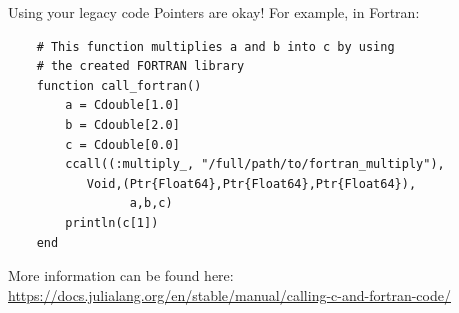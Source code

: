 \documentclass{beamer}
\begin{document}
\begin{frame}[fragile]{Using your legacy code}
Pointers are okay! For example, in Fortran:

\begin{Verbatim}
    # This function multiplies a and b into c by using 
    # the created FORTRAN library
    function call_fortran()
        a = Cdouble[1.0]
        b = Cdouble[2.0]
        c = Cdouble[0.0]
        ccall((:multiply_, "/full/path/to/fortran_multiply"),
           Void,(Ptr{Float64},Ptr{Float64},Ptr{Float64}),
                 a,b,c)
        println(c[1])
    end
\end{Verbatim}

\pause
More information can be found here: \url{https://docs.julialang.org/en/stable/manual/calling-c-and-fortran-code/}
\end{frame}
\end{document}

